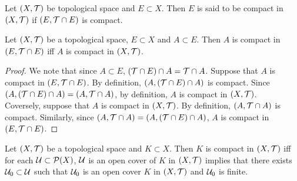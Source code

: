 \documentclass{book}
\begin{document}
	\begin{defn} 
		Let $(X, \mathcal{T})$ be topological space and $E \subset X$. Then $E$ is said to be compact in $(X, \mathcal{T})$ if $(E, \mathcal{T} \cap E)$ is compact. 
	\end{defn}

	\begin{ex} 
		Let $(X, \mathcal{T})$ be a topological space, $E \subset X$ and $A \subset E$. Then $A$ is compact in $(E, \mathcal{T} \cap E)$ iff $A$ is compact in $(X, \mathcal{T})$.
	\end{ex}

	\begin{proof}
		We note that since $A \subset E$, $(\mathcal{T} \cap E) \cap A = \mathcal{T} \cap A$. Suppose that $A$ is compact in $(E, \mathcal{T} \cap E)$. By definition, $(A, (\mathcal{T} \cap E) \cap A)$ is compact. Since $(A, (\mathcal{T} \cap E) \cap A) = (A, \mathcal{T} \cap A)$, by definition, $A$ is compact in $(X, \mathcal{T})$.\\
		Coversely, suppose that $A$ is compact in $(X, \mathcal{T})$. By definition, $(A, \mathcal{T} \cap A)$ is compact. Similarly, since $ (A, \mathcal{T} \cap A) = (A, (\mathcal{T} \cap E) \cap A)$, $A$ is compact in $(E, \mathcal{T} \cap E)$.
	\end{proof}

	\begin{ex} 
		Let $(X, \mathcal{T})$ be a topological space and $K \subset X$. Then $K$ is compact in $(X, \mathcal{T})$ iff for each $\mathcal{U} \subset \mathcal{P}(X)$, $\mathcal{U}$ is an open cover of $K$ in $(X, \mathcal{T})$ implies that there exists $\mathcal{U}_0 \subset \mathcal{U}$ such that $\mathcal{U}_0$ is an open cover $K$ in $(X, \mathcal{T})$ and $\mathcal{U}_0$ is finite.
	\end{ex}
\end{document}
